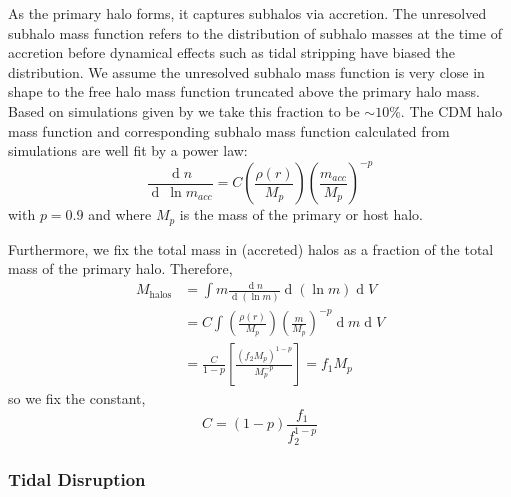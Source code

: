 \documentclass[usenatbib]{mnras}
\renewcommand{\d}[1]{\! \mathrm{d}#1 \:}
\newcommand{\deriv}[2]{\frac{\d{#1}}{\d{#2}}}
\renewcommand{\d}[1]{\ensuremath{\operatorname{d}\!{#1}}}
\begin{document}
	As the primary halo forms, it captures subhalos via accretion. The unresolved subhalo mass function refers to the distribution of subhalo masses at the time of accretion before dynamical effects such as tidal stripping have biased the distribution. We assume the unresolved subhalo mass function is very close in shape to the free halo mass function truncated above the primary halo mass. Based on simulations given by \citet{dark_wave} we take this fraction to be $\sim 10\%$. The CDM halo mass function and corresponding subhalo mass function calculated from simulations \citep{pop_of_subhalos, unified_model} are well fit by a power law: 
\begin{equation}
\frac{\d{n}}{\d{\: \ln{m_{acc}}}} = C \left(\frac{\rho(r)}{M_p}\right) \left(\frac{m_{acc}}{M_p} \right)^{-p} 
\end{equation}
with $p = 0.9$ and where $M_p$ is the mass of the primary or host halo.
\par
Furthermore, we fix the total mass in (accreted) halos as a fraction of the total mass of the primary halo. Therefore,
\begin{align}
M_{\mathrm{halos}} & = \int m \deriv{n}{(\ln{m})} \d{(\ln{m})} \d{V}
\\
& = C \int \left(\frac{\rho(r)}{M_p}\right) \left(\frac{m}{M_p} \right)^{-p} \d{m} \d{V} 
\\
& = \frac{C}{1-p} \left[ \frac{(f_2 M_p)^{1-p}}{M_p^{-p}} \right] = f_1 M_p 
\end{align} 
so we fix the constant,
\begin{equation}
C = (1 - p)\frac{f_1}{f_2^{1-p}} 
\end{equation}

\subsubsection{Tidal Disruption} 
\end{document}
